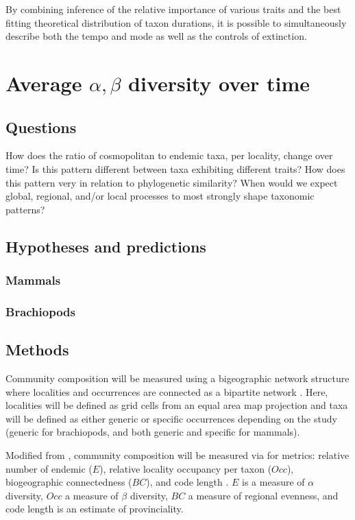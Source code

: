 \documentclass[12pt,letterpaper]{article}
\begin{document}
By combining inference of the relative importance of various traits and the best fitting theoretical distribution of taxon durations, it is possible to simultaneously describe both the tempo and mode as well as the controls of extinction.


\section{Average \(\alpha, \beta\) diversity over time}
\subsection{Questions}
How does the ratio of cosmopolitan to endemic taxa, per locality, change over time? Is this pattern different between taxa exhibiting different traits? How does this pattern very in relation to phylogenetic similarity? When would we expect global, regional, and/or local processes to most strongly shape taxonomic patterns?

\subsection{Hypotheses and predictions}
\subsubsection{Mammals}
\subsubsection{Brachiopods}

\subsection{Methods}
Community composition will be measured using a bigeographic network structure where localities and occurrences are connected as a bipartite network \citep{Sidor2013,Vilhena2013,Vilhena2013b}. Here, localities will be defined as grid cells from an equal area map projection and taxa will be defined as either generic or specific occurrences depending on the study (generic for brachiopods, and both generic and specific for mammals). 

Modified from \citet{Sidor2013}, community composition will be measured via for metrics: relative number of endemic (\(E\)), relative locality occupancy per taxon (\(Occ\)), biogeographic connectedness (\(BC\)), and code length \citep{Rosvall2008,Rosvall2009a}. \(E\) is a measure of \(\alpha\) diversity, \(Occ\) a measure of \(\beta\) diversity, \(BC\) a measure of regional evenness, and code length is an estimate of provinciality.
\end{document}
